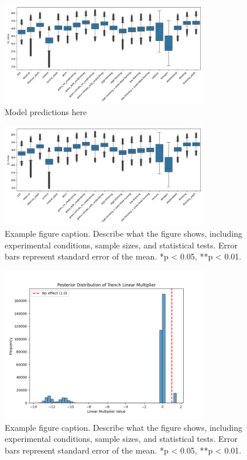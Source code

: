 \documentclass[12pt,a4paper]{article}
\begin{document}
\begin{figure}[H]
    \centering
    \includegraphics[width=0.8\textwidth]{"../ea_boxplot.png"}
    \caption{Model predictions here}
    \label{fig:ea_boxplot}
\end{figure}

\begin{figure}[H]
    \centering
    \includegraphics[width=0.8\textwidth]{"../ea_boxplot.png"}
    \caption{Example figure caption. Describe what the figure shows, including experimental conditions, sample sizes, and statistical tests. Error bars represent standard error of the mean. *p < 0.05, **p < 0.01.}
    \label{fig:ea_boxplot}
\end{figure}

\begin{figure}[H]
    \centering
    \includegraphics[width=0.8\textwidth]{"../linear_multiplier.png"}
    \caption{Example figure caption. Describe what the figure shows, including experimental conditions, sample sizes, and statistical tests. Error bars represent standard error of the mean. *p < 0.05, **p < 0.01.}
    \label{fig:linear_mult}
\end{figure}
\end{document}
